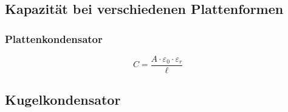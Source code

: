 



\subsection{Kapazität bei verschiedenen Plattenformen}

\subsubsection{Plattenkondensator}
\[ C = \frac{A \cdot \varepsilon_0 \cdot \varepsilon_r}{\ell} \]

\subsection{Kugelkondensator}
